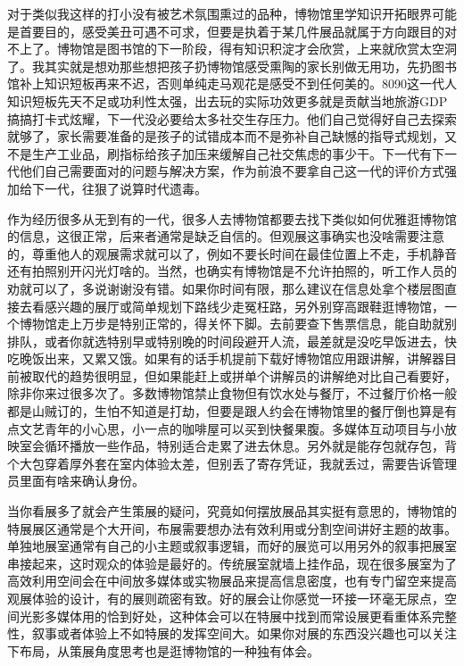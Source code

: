 \documentclass[
  letterpaper,
  DIV=11,
  numbers=noendperiod]{scrreprt}
\begin{document}
对于类似我这样的打小没有被艺术氛围熏过的品种，博物馆里学知识开拓眼界可能是首要目的，感受美丑可遇不可求，但要是执着于某几件展品就属于方向跟目的对不上了。博物馆是图书馆的下一阶段，得有知识积淀才会欣赏，上来就欣赏太空洞了。我其实就是想劝那些想把孩子扔博物馆感受熏陶的家长别做无用功，先扔图书馆补上知识短板再来不迟，否则单纯走马观花是感受不到任何美的。8090这一代人知识短板先天不足或功利性太强，出去玩的实际功效更多就是贡献当地旅游GDP搞搞打卡式炫耀，下一代没必要给太多社交生存压力。他们自己觉得好自己去探索就够了，家长需要准备的是孩子的试错成本而不是弥补自己缺憾的指导式规划，又不是生产工业品，刷指标给孩子加压来缓解自己社交焦虑的事少干。下一代有下一代他们自己需要面对的问题与解决方案，作为前浪不要拿自己这一代的评价方式强加给下一代，往狠了说算时代遗毒。

作为经历很多从无到有的一代，很多人去博物馆都要去找下类似如何优雅逛博物馆的信息，这很正常，后来者通常是缺乏自信的。但观展这事确实也没啥需要注意的，尊重他人的观展需求就可以了，例如不要长时间在最佳位置上不走，手机静音还有拍照别开闪光灯啥的。当然，也确实有博物馆是不允许拍照的，听工作人员的劝就可以了，多说谢谢没有错。如果你时间有限，那么建议在信息处拿个楼层图直接去看感兴趣的展厅或简单规划下路线少走冤枉路，另外别穿高跟鞋逛博物馆，一个博物馆走上万步是特别正常的，得关怀下脚。去前要查下售票信息，能自助就别排队，或者你就选特别早或特别晚的时间段避开人流，最差就是没吃早饭进去，快吃晚饭出来，又累又饿。如果有的话手机提前下载好博物馆应用跟讲解，讲解器目前被取代的趋势很明显，但如果能赶上或拼单个讲解员的讲解绝对比自己看要好，除非你来过很多次了。多数博物馆禁止食物但有饮水处与餐厅，不过餐厅价格一般都是山贼订的，生怕不知道是打劫，但要是跟人约会在博物馆里的餐厅倒也算是有点文艺青年的小心思，小一点的咖啡屋可以买到快餐果腹。多媒体互动项目与小放映室会循环播放一些作品，特别适合走累了进去休息。另外就是能存包就存包，背个大包穿着厚外套在室内体验太差，但别丢了寄存凭证，我就丢过，需要告诉管理员里面有啥来确认身份。

当你看展多了就会产生策展的疑问，究竟如何摆放展品其实挺有意思的，博物馆的特展展区通常是个大开间，布展需要想办法有效利用或分割空间讲好主题的故事。单独地展室通常有自己的小主题或叙事逻辑，而好的展览可以用另外的叙事把展室串接起来，这时观众的体验是最好的。传统展室就墙上挂作品，现在很多展室为了高效利用空间会在中间放多媒体或实物展品来提高信息密度，也有专门留空来提高观展体验的设计，有的展则疏密有致。好的展会让你感觉一环接一环毫无尿点，空间光影多媒体用的恰到好处，这种体会可以在特展中找到而常设展更看重体系完整性，叙事或者体验上不如特展的发挥空间大。如果你对展的东西没兴趣也可以关注下布局，从策展角度思考也是逛博物馆的一种独有体会。
\end{document}
